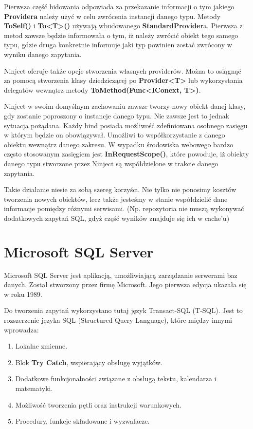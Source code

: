Pierwsza część bidowania odpowiada za przekazanie informacji o tym jakiego \textbf{Providera} należy użyć w celu zwrócenia instancji danego typu.
Metody \textbf{ToSelf()} i \textbf{To<T>()} używają wbudowanego \textbf{StandardProvider}a. Pierwsza z metod zawsze będzie informowała o tym, iż należy zwrócić obiekt tego samego typu, gdzie druga konkretnie informuje jaki typ powinien zostać zwrócony w wyniku danego zapytania.

Ninject oferuje także opcje stworzenia własnych providerów. Można to osiągnąć za pomocą stworzenia klasy dziedziczącej po \textbf{Provider<T>} lub wykorzystania delegatów wewnątrz metody \textbf{ToMethod(Func<IConext, T>)}.

Ninject w swoim domyślnym zachowaniu zawsze tworzy nowy obiekt danej klasy, gdy zostanie poproszony o instancje danego typu. Nie zawsze jest to jednak sytuacja pożądana. Każdy bind posiada możliwość zdefiniowana osobnego zasięgu w którym będzie on obowiązywał. Umożliwi to współkorzystanie z danego obiektu wewnątrz danego zakresu. W wypadku środowiska webowego bardzo często stosowanym zasięgiem jest \textbf{InRequestScope()}, które powoduje, iż obiekty danego typu stworzone przez Ninject są współdzielone w trakcie danego zapytania. 

Takie działanie niesie za sobą szereg korzyści. Nie tylko nie ponosimy kosztów tworzenia nowych obiektów, lecz także jesteśmy w stanie współdzielić dane informacje pomiędzy różnymi serwisami. (Np. repozytoria nie muszą wykonywać dodatkowych zapytań SQL, gdyż część wyników znajduje się ich w cache'u)

\newpage
{\let\cleardoublepage\relax \chapter{Microsoft SQL Server}}

Microsoft SQL Server\cite{SqlServer} jest aplikacją, umożliwiającą zarządzanie serwerami baz danych. Został stworzony przez firmę Microsoft. Jego pierwsza edycja ukazała się w roku 1989.

Do tworzenia zapytań wykorzystano tutaj język Transact-SQL (T-SQL). Jest to rozszerzenie języka SQL (Structured Query Language), które między innymi wprowadza:

\begin{enumerate}
	\item Lokalne zmienne.
	\item Blok \textbf{Try Catch}, wspierający obsługę wyjątków.
	\item Dodatkowe funkcjonalności związane z obsługą tekstu, kalendarza i matematyki.
	\item Możliwość tworzenia pętli oraz instrukcji warunkowych.
	\item Procedury, funkcje składowane i wyzwalacze.
\end{enumerate} 


